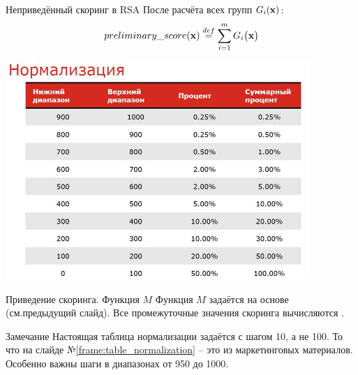 \begin{frame}{Неприведённый скоринг в RSA}
	После расчёта всех групп $G_i ( \bold x )$: 
	\begin{equation}
	preliminary\_score(\bold x) \stackrel{def}{=} \sum_{i=1}^{m} G_i \big( \bold x \big)
	\end{equation}
\end{frame}

\begin{frame}\label{frame:table_normalization}
	\begin{center}
		\includegraphics[width=11.5cm]{../pic/rsa_preliminary_score_normalization.png}
	\end{center}
\end{frame}

\begin{frame}{Приведение скоринга. Функция $M$}
	Функция $M$ задаётся на основе  (см.предыдущий слайд).
	Все промежуточные значения скоринга вычисляются .
	
	\begin{block}{Замечание}
		Настоящая таблица нормализации задаётся с шагом 10, а не 100. 
		То что на слайде №\ref{frame:table_normalization} -- это из маркетинговых материалов.
		Особенно важны шаги в диапазонах от 950 до 1000.
	\end{block} 
	

\end{frame}

